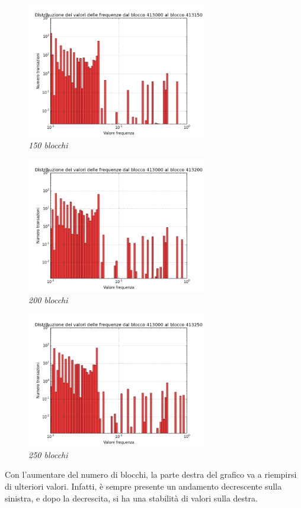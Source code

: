 \begin{figure}[htbp]
	\centering
	\includegraphics[width=0.7\textwidth]{figure/hist150b}
	\caption{\textit{150 blocchi}\label{fig:hist150b}}
\end{figure}

\begin{figure}[htbp]
	\centering
	\includegraphics[width=0.7\textwidth]{figure/hist200b}
	\caption{\textit{200 blocchi}\label{fig:hist200b}}
\end{figure}

\begin{figure}[htbp]
	\centering
	\includegraphics[width=0.7\textwidth]{figure/hist250b}
	\caption{\textit{250 blocchi}\label{fig:hist250b}}
\end{figure}
\newpage
Con l'aumentare del numero di blocchi, la parte destra del grafico va a riempirsi di ulteriori valori. Infatti, è sempre presente un andamento decrescente sulla sinistra, e dopo la decrescita, si ha una stabilità di valori sulla destra.

